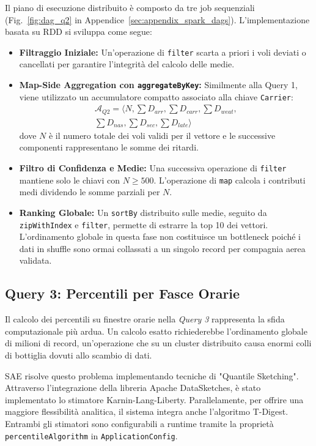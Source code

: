 \documentclass[conference]{IEEEtran}
\begin{document}
Il piano di esecuzione distribuito è composto da tre job sequenziali (Fig.~\ref{fig:dag_q2} in Appendice~\ref{sec:appendix_spark_dags}).
L'implementazione basata su RDD si sviluppa come segue:
\begin{itemize}
    \item \textbf{Filtraggio Iniziale:} Un'operazione di \texttt{filter} scarta a priori i voli deviati o cancellati per garantire l'integrità del calcolo delle medie.
    \item \textbf{Map-Side Aggregation con \texttt{aggregateByKey}:} Similmente alla Query 1, viene utilizzato un accumulatore compatto associato alla chiave \texttt{Carrier}:
    \[
    \begin{aligned}
    \mathcal{A}_{Q2} = \langle N, \textstyle \sum D_{arr}, \textstyle \sum D_{carr}, \textstyle \sum D_{weat}, \\
    \textstyle \sum D_{nas}, \textstyle \sum D_{sec}, \textstyle \sum D_{late} \rangle
    \end{aligned}
    \]
    dove $N$ è il numero totale dei voli validi per il vettore e le successive componenti rappresentano le somme dei ritardi.
    \item \textbf{Filtro di Confidenza e Medie:} Una successiva operazione di \texttt{filter} mantiene solo le chiavi con $N \ge 500$. L'operazione di \texttt{map} calcola i contributi medi dividendo le somme parziali per $N$.
    \item \textbf{Ranking Globale:} Un \texttt{sortBy} distribuito sulle medie, seguito da \texttt{zipWithIndex} e \texttt{filter}, permette di estrarre la top 10 dei vettori. L'ordinamento globale in questa fase non costituisce un bottleneck poiché i dati in shuffle sono ormai collassati a un singolo record per compagnia aerea validata.
\end{itemize}

\subsection{Query 3: Percentili per Fasce Orarie}
Il calcolo dei percentili su finestre orarie nella \textit{Query 3} rappresenta la sfida computazionale più ardua.
Un calcolo esatto richiederebbe l'ordinamento globale di milioni di record, un'operazione che su un cluster distribuito causa enormi colli di bottiglia dovuti allo scambio di dati.

SAE risolve questo problema implementando tecniche di "Quantile Sketching".
Attraverso l'integrazione della libreria Apache DataSketches, è stato implementato lo stimatore Karnin-Lang-Liberty.
Parallelamente, per offrire una maggiore flessibilità analitica, il sistema integra anche l'algoritmo T-Digest. Entrambi gli stimatori sono configurabili a runtime tramite la proprietà \texttt{percentileAlgorithm} in \texttt{ApplicationConfig}.
\end{document}
